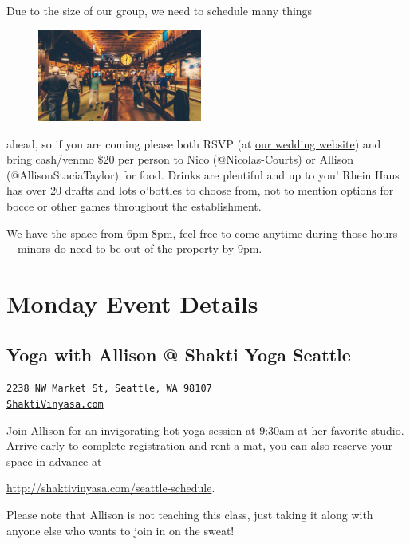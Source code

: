 \documentclass[12pt]{article}
\begin{document}
Due to the size 
of our group, we need to schedule many things 
\begin{figure}
    \begin{center}
        \includegraphics[width=0.48\textwidth]{rheinhaus}
    \end{center}
\end{figure}
ahead, so if you are coming please both RSVP (at \href{https://courtay.info}{our wedding website}) and bring cash/venmo 
\$20 per person to Nico (@Nicolas-Courts) or Allison (@AllisonStaciaTaylor) for food. Drinks are plentiful and up 
to you! Rhein Haus has over 20 drafts and lots o'bottles to choose from, not to mention options for bocce or other 
games throughout the establishment. 

We have the space from 6pm-8pm, feel free to come 
anytime during those hours---minors do need to be out of the property by 9pm.


\section{Monday Event Details}
\subsection{Yoga with Allison @ Shakti Yoga Seattle}
\label{subsec-yoga}
\begin{center}
    \texttt{2238 NW Market St, Seattle, WA 98107\\\href{http://shaktivinyasa.com/}{ShaktiVinyasa.com}}
\end{center}

Join Allison for an invigorating hot yoga session at 9:30am at her favorite studio. Arrive early to complete 
registration and rent a mat, you can also reserve your space in advance at 
\begin{center}
    \href{http://shaktivinyasa.com/seattle-schedule}{http://shaktivinyasa.com/seattle-schedule}.
\end{center}

Please note that Allison is not teaching this class, just taking it along with anyone else who wants to 
join in on the sweat!
\end{document}
